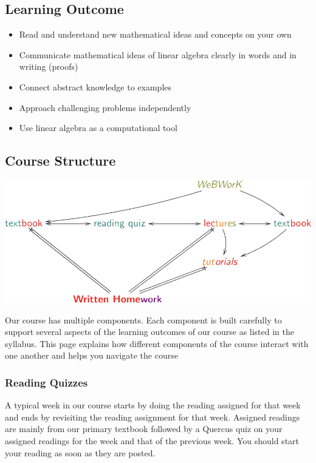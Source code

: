 \documentclass[11pt,fleqn]{book} %
\begin{document}
\subsection{Learning Outcome}

\begin{itemize}
    \item Read and understand new mathematical ideas and concepts on your own
    \item Communicate mathematical ideas of linear algebra clearly in words and in writing (proofs)
    \item Connect abstract knowledge to examples
    \item Approach challenging problems independently
    \item Use linear algebra as a computational tool
\end{itemize}

\subsection{Course Structure}

\begin{center}
    \includegraphics[width=0.75\linewidth]{Pictures/Course Structure.png}
\end{center}

Our course has multiple components. Each component is built carefully to support several aspects of the learning outcomes of our course as listed in the syllabus. This page explains how different components of the course interact with one another and helps you navigate the course

\subsubsection{Reading Quizzes}

A typical week in our course starts by doing the reading assigned for that week and ends by revisiting the reading assignment for that week.  Assigned readings are mainly from our primary textbook \cite{texbook} followed by a Quercus quiz on your assigned readings for the week and that of the previous week.  You should start your reading as soon as they are posted.
\end{document}
